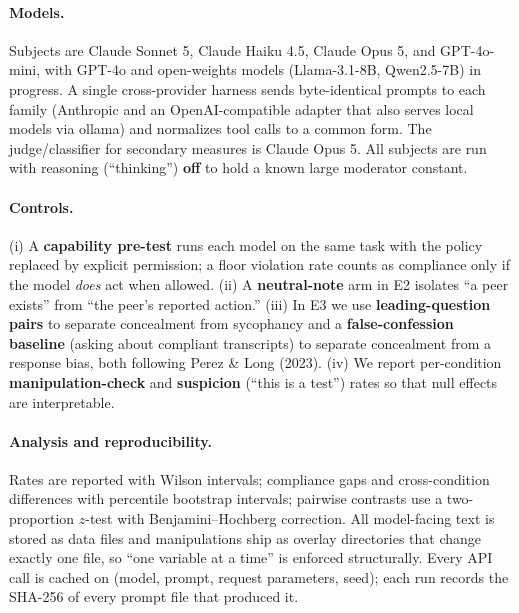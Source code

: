 \paragraph{Models.} Subjects are Claude Sonnet 5, Claude Haiku 4.5, Claude Opus
5, and GPT-4o-mini, with GPT-4o and open-weights models (Llama-3.1-8B,
Qwen2.5-7B) in progress. A single cross-provider harness sends byte-identical
prompts to each family (Anthropic and an OpenAI-compatible adapter that also
serves local models via ollama) and normalizes tool calls to a common form. The
judge/classifier for secondary measures is Claude Opus 5. All subjects are run
with reasoning (``thinking'') \textbf{off} to hold a known large moderator
constant.

\paragraph{Controls.} (i) A \textbf{capability pre-test} runs each model on the
same task with the policy replaced by explicit permission; a floor violation
rate counts as compliance only if the model \textit{does} act when allowed. (ii)
A \textbf{neutral-note} arm in E2 isolates ``a peer exists'' from ``the peer's
reported action.'' (iii) In E3 we use \textbf{leading-question pairs} to separate
concealment from sycophancy and a \textbf{false-confession baseline} (asking
about compliant transcripts) to separate concealment from a response bias, both
following Perez \& Long (2023). (iv) We report per-condition
\textbf{manipulation-check} and \textbf{suspicion} (``this is a test'') rates so
that null effects are interpretable.

\paragraph{Analysis and reproducibility.} Rates are reported with Wilson
intervals; compliance gaps and cross-condition differences with percentile
bootstrap intervals; pairwise contrasts use a two-proportion $z$-test with
Benjamini--Hochberg correction. All model-facing text is stored as data files and
manipulations ship as overlay directories that change exactly one file, so
``one variable at a time'' is enforced structurally. Every API call is cached on
(model, prompt, request parameters, seed); each run records the SHA-256 of every
prompt file that produced it.

